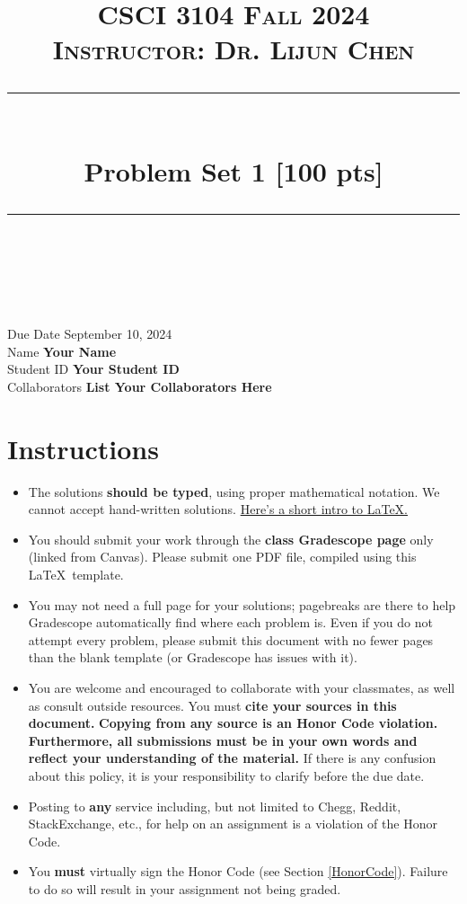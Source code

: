 \documentclass[11pt]{article}
\title{
\normalfont \normalsize 
\textsc{CSCI 3104 Fall 2024 \\ 
Instructor: Dr. Lijun Chen} \\
[10pt] 
\rule{\linewidth}{0.5pt} \\[6pt] 
\huge Problem Set 1 [100 pts] \\
\rule{\linewidth}{2pt}  \\[10pt]
}
\date{}
\theoremstyle{definition}
\theoremstyle{definition}
\theoremstyle{definition}
\begin{document}
\maketitle


\noindent
Due Date \dotfill September 10, 2024  \\
Name \dotfill \textbf{Your Name} \\
Student ID \dotfill \textbf{Your Student ID} \\
Collaborators \dotfill \textbf{List Your Collaborators Here}

\tableofcontents

\section*{Instructions}
 \begin{itemize}
	\item The solutions \textbf{should be typed}, using proper mathematical notation. We cannot accept hand-written solutions. \href{http://ece.uprm.edu/~caceros/latex/introduction.pdf}{Here's a short intro to \LaTeX.}
	\item You should submit your work through the \textbf{class Gradescope page} only (linked from Canvas). Please submit one PDF file, compiled using this \LaTeX \ template.
	\item You may not need a full page for your solutions; pagebreaks are there to help Gradescope automatically find where each problem is. Even if you do not attempt every problem, please submit this document with no fewer pages than the blank template (or Gradescope has issues with it).

	\item You are welcome and encouraged to collaborate with your classmates, as well as consult outside resources. You must \textbf{cite your sources in this document.} \textbf{Copying from any source is an Honor Code violation. Furthermore, all submissions must be in your own words and reflect your understanding of the material.} If there is any confusion about this policy, it is your responsibility to clarify before the due date. 

	\item Posting to \textbf{any} service including, but not limited to Chegg, Reddit, StackExchange, etc., for help on an assignment is a violation of the Honor Code.

	\item You \textbf{must} virtually sign the Honor Code (see Section \ref{HonorCode}). Failure to do so will result in your assignment not being graded.
\end{itemize}
\end{document}
